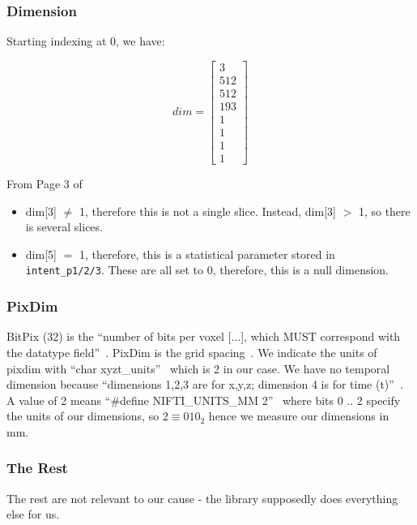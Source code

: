 \documentclass[11pt]{article}
\begin{document}
\subsubsection{Dimension}

Starting indexing at 0, we have: 

\begin{equation*}
    dim = \begin{bmatrix}3 \\ 512 \\ 512 \\ 193 \\ 1 \\ 1 \\ 1 \\ 1\end{bmatrix}
\end{equation*}


From Page 3 of~\cite{nifti-data-format} 

\begin{itemize}
    \item dim[3] $\neq$ 1, therefore this is not a single slice. Instead, dim[3] $>$ 1, so there is several slices.
    \item dim[5] $=$ 1, therefore, this is a statistical parameter stored in \texttt{intent\_p1/2/3}. These are all set to 0, therefore, this is a null dimension.
\end{itemize}

\subsubsection{PixDim}

BitPix (32) is the ``number of bits per voxel [...], which MUST correspond with the datatype field''~\cite{nifti-headers}. PixDim is the grid spacing~\cite{nifti-headers}. We indicate the units of pixdim with ``char xyzt\_units''~\cite{nifti-headers} which is 2 in our case. We have no temporal dimension because ``dimensions 1,2,3 are for x,y,z; dimension 4 is for time (t)''~\cite{nifti-headers}. A value of 2 means ``\#define NIFTI\_UNITS\_MM      2''~\cite{nifti-headers} where bits 0 .. 2 specify the units of our dimensions, so $2 \equiv 010_2$ hence we measure our dimensions in mm.

\subsubsection{The Rest}

The rest are not relevant to our cause - the library supposedly does everything else for us.
\end{document}
